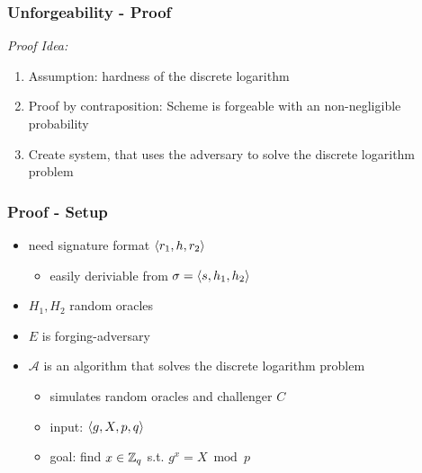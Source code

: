 \begin{frame}
	\frametitle{Unforgeability - Proof}
	
	\textit{Proof Idea:}
	\begin{enumerate}[<+->]
		\item Assumption: hardness of the discrete logarithm
		\item Proof by contraposition: Scheme is forgeable with an non-negligible probability
		\item Create system, that uses the adversary to solve the discrete logarithm problem
	\end{enumerate}
\end{frame}

\begin{frame}
	\frametitle{Proof - Setup}

	\begin{itemize}[<+->]
		\item need signature format $\langle r_1, h, r_2 \rangle$
		\begin{itemize}
			\item easily deriviable from $\sigma = \langle s, h_1, h_2 \rangle$
		\end{itemize}
		\item $H_1, H_2$ random oracles
		\item $E$ is forging-adversary
		\item $\mathcal{A}$ is an algorithm that solves the discrete logarithm problem
			\begin{itemize}
				\item simulates random oracles and challenger $C$
				\item input: $\langle g, X, p , q \rangle$
				\item goal: find $x\in\mathbb{Z}_q$ s.t. $g^x = X \bmod p$
			\end{itemize}
	\end{itemize}
\end{frame}

